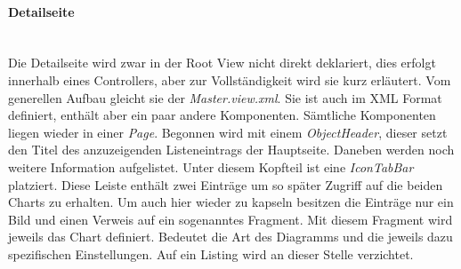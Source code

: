 \paragraph{Detailseite}$\;$ \\
Die Detailseite wird zwar in der Root View nicht direkt deklariert, dies erfolgt innerhalb eines Controllers, aber zur Vollständigkeit wird sie kurz erläutert. Vom generellen Aufbau gleicht sie der \textit{Master.view.xml}. Sie ist auch im XML Format definiert, enthält aber ein paar andere Komponenten. Sämtliche Komponenten liegen wieder in einer \textit{Page}. Begonnen wird mit einem \textit{ObjectHeader}, dieser setzt den Titel des anzuzeigenden Listeneintrags der Hauptseite. Daneben werden noch weitere Information aufgelistet. Unter diesem Kopfteil ist eine \textit{IconTabBar} platziert. Diese Leiste enthält zwei Einträge um so später Zugriff auf die beiden Charts zu erhalten. Um auch hier wieder zu kapseln besitzen die Einträge nur ein Bild und einen Verweis auf ein sogenanntes Fragment. Mit diesem Fragment wird jeweils das Chart definiert. Bedeutet die Art des Diagramms und die jeweils dazu spezifischen Einstellungen. Auf ein Listing wird an dieser Stelle verzichtet.

